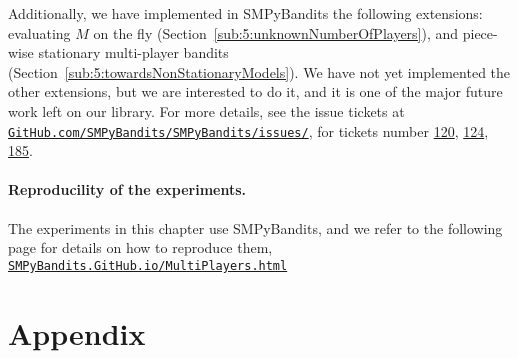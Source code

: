 Additionally, we have implemented in SMPyBandits \cite{SMPyBandits} the following extensions: evaluating $M$ on the fly (Section~\ref{sub:5:unknownNumberOfPlayers}), and piece-wise stationary multi-player bandits (Section~\ref{sub:5:towardsNonStationaryModels}).
We have not yet implemented the other extensions, but we are interested to do it, and it is one of the major future work left on our library.
For more details, see the issue tickets at \href{https://github.com/SMPyBandits/SMPyBandits/issues/}{\texttt{GitHub.com/SMPyBandits/SMPyBandits/issues/}}, for tickets number \href{https://github.com/SMPyBandits/SMPyBandits/issues/120}{120}, \href{https://github.com/SMPyBandits/SMPyBandits/issues/124}{124}, \href{https://github.com/SMPyBandits/SMPyBandits/issues/185}{185}.

\paragraph{Reproducility of the experiments.}

The experiments in this chapter use SMPyBandits,
and we refer to the following page for details on how to reproduce them,\\
\href{https://SMPyBandits.GitHub.io/MultiPlayers.html}{\texttt{SMPyBandits.GitHub.io/MultiPlayers.html}}






\newpage
\section{Appendix}
\label{sec:5:appendix}




